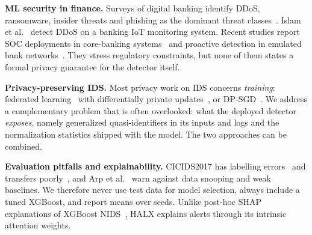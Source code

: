 \textbf{ML security in finance.} Surveys of digital banking identify DDoS,
ransomware, insider threats and phishing as the dominant threat
classes~\cite{asmar2024banks}. Islam et al.~\cite{islam2022ddosbank} detect
DDoS on a banking IoT monitoring system. Recent studies report SOC
deployments in core-banking systems~\cite{bhowmick2026cbs} and proactive
detection in emulated bank networks~\cite{mulea2026banking}. They stress
regulatory constraints, but none of them states a formal privacy guarantee
for the detector itself.

\textbf{Privacy-preserving IDS.} Most privacy work on IDS concerns
\emph{training}: federated learning~\cite{mcmahan2017fedavg} with
differentially private updates~\cite{ruzafa2023fl,gutti2025fl,vyas2024ppfl},
or DP-SGD~\cite{abadi2016dpsgd}. We address a complementary
problem that is often overlooked: what the deployed detector \emph{exposes},
namely generalized quasi-identifiers in its inputs and logs and the
normalization statistics shipped with the model. The two approaches can be
combined.

\textbf{Evaluation pitfalls and explainability.} CICIDS2017 has labelling
errors~\cite{engelen2021troubleshooting} and transfers
poorly~\cite{catillo2022transferability}, and Arp et al.~\cite{arp2022dos}
warn against data snooping and weak baselines. We therefore never use test
data for model selection, always include a tuned XGBoost, and report means
over seeds. Unlike post-hoc SHAP explanations of XGBoost
NIDS~\cite{neupane2022xids,barnard2022xai}, HALX explains alerts through its
intrinsic attention weights.
